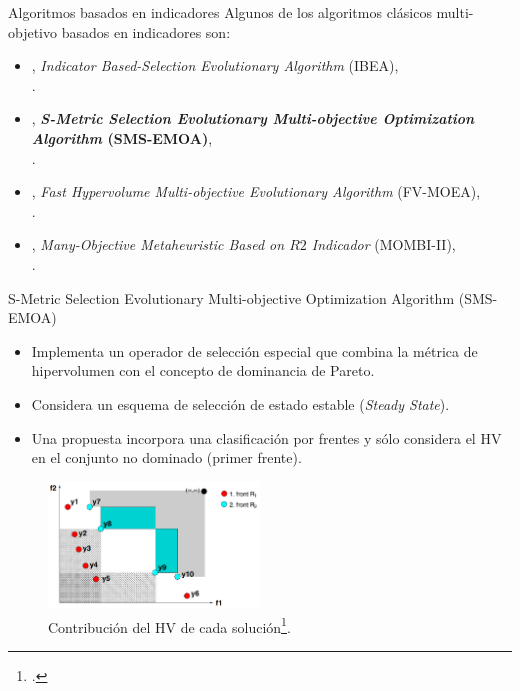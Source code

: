 \documentclass{beamer}
\begin{document}
\begin{frame}{Algoritmos basados en indicadores}
Algunos de los algoritmos clásicos multi-objetivo basados en indicadores son:
\begin{itemize}
\scriptsize
   \item \citeyear{Joel:IBEA}, \textit{Indicator Based-Selection Evolutionary Algorithm } (IBEA), \\ \citeauthor{Joel:IBEA}.
   \item \citeyear{Joel:SMSEMOA}, \textbf{\textit{S-Metric Selection Evolutionary Multi-objective Optimization Algorithm} (SMS-EMOA)}, \\ \citeauthor{Joel:SMSEMOA}.
   \item \citeyear{Joel:FV-MOEA}, \textit{Fast Hypervolume Multi-objective Evolutionary Algorithm} (FV-MOEA), \\ \citeauthor{Joel:FV-MOEA}.
   \item \citeyear{Joel:MOMBI-II}, \textit{Many-Objective Metaheuristic Based on $R2$ Indicador} (MOMBI-II), \\ \citeauthor{Joel:MOMBI-II}.
\end{itemize}
\end{frame}



\begin{frame}{S-Metric Selection Evolutionary Multi-objective Optimization Algorithm (SMS-EMOA)}
\begin{itemize}
\scriptsize
\item Implementa un operador de selección especial que combina la métrica de hipervolumen con el concepto de dominancia de Pareto.
%
\item Considera un esquema de selección de estado estable (\textit{Steady State}).
\item Una propuesta incorpora una clasificación por frentes y sólo considera el HV en el conjunto no dominado (primer frente).
\end{itemize}
\begin{figure}[H]
\centering
\includegraphics[width=0.5\textwidth]{sms_emoa.png}
\caption{\scriptsize Contribución del HV de cada solución\footcite{Joel:SMSEMOA}.}
\end{figure}
\end{frame}
\end{document}

